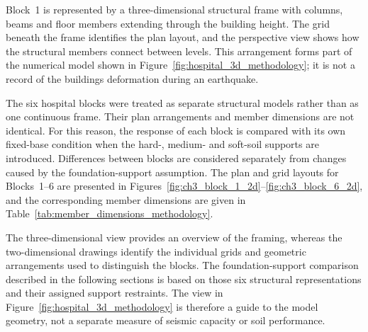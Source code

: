 Block~1 is represented by a three-dimensional structural frame with columns, beams and floor members extending through the building height. The grid beneath the frame identifies the plan layout, and the perspective view shows how the structural members connect between levels. This arrangement forms part of the numerical model shown in Figure~\ref{fig:hospital_3d_methodology}; it is not a record of the building\textquotesingle s deformation during an earthquake.

The six hospital blocks were treated as separate structural models rather than as one continuous frame. Their plan arrangements and member dimensions are not identical. For this reason, the response of each block is compared with its own fixed-base condition when the hard-, medium- and soft-soil supports are introduced. Differences between blocks are considered separately from changes caused by the foundation-support assumption. The plan and grid layouts for Blocks~1--6 are presented in Figures~\ref{fig:ch3_block_1_2d}--\ref{fig:ch3_block_6_2d}, and the corresponding member dimensions are given in Table~\ref{tab:member_dimensions_methodology}.

The three-dimensional view provides an overview of the framing, whereas the two-dimensional drawings identify the individual grids and geometric arrangements used to distinguish the blocks. The foundation-support comparison described in the following sections is based on those six structural representations and their assigned support restraints. The view in Figure~\ref{fig:hospital_3d_methodology} is therefore a guide to the model geometry, not a separate measure of seismic capacity or soil performance.

